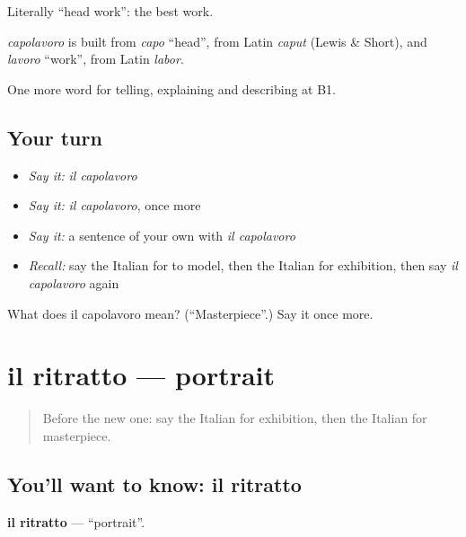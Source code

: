 Literally \textquotedblleft{}head work\textquotedblright{}: the best work.

\begin{cousinweb}
\emph{capolavoro} is built from \emph{capo} \textquotedblleft{}head\textquotedblright{}, from Latin \emph{caput} (Lewis \& Short), and \emph{lavoro} \textquotedblleft{}work\textquotedblright{}, from Latin \emph{labor}.
\end{cousinweb}

\begin{grammarlens}[title={What you've built}]
One more word for telling, explaining and describing at B1.
\end{grammarlens}

\subsection*{Your turn}
\begin{itemize}
\raggedright
  \item \emph{Say it:} \emph{il capolavoro}
  \item \emph{Say it:} \emph{il capolavoro}, once more
  \item \emph{Say it:} a sentence of your own with \emph{il capolavoro}
  \item \emph{Recall:} say the Italian for to model, then the Italian for exhibition, then say \emph{il capolavoro} again
\end{itemize}

\begin{tcolorbox}[breakable,colback=teal!4,colframe=teal!35!black,title={Before you move on}]
What does il capolavoro mean? (\textquotedblleft{}Masterpiece\textquotedblright{}.) Say it once more.
\end{tcolorbox}
\section[il ritratto]{il ritratto — portrait}

\label{lesson:IT-C523-ritratto}



\begin{quote}
Before the new one: say the Italian for exhibition, then the Italian for masterpiece.
\end{quote}

\subsection*{You'll want to know: il ritratto}
\textbf{il ritratto} — \textquotedblleft{}portrait\textquotedblright{}.


